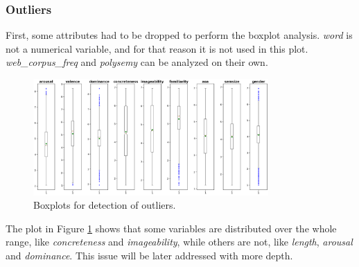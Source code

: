 \documentclass[a4paper,11pt,dvipsnames]{article}
\begin{document}

\subsubsection{Outliers}


First, some attributes had to be dropped to perform the boxplot analysis. \textit{word} is not a numerical variable, and for that reason it is not used in this plot. \textit{web\_corpus\_freq} and \textit{polysemy} can be analyzed on their own.

\begin{figure}[h]
    \centering
    \includegraphics[width=0.8\textwidth]{Graphs/outliers.png}
    \caption{Boxplots for detection of outliers.}
    \label{fig:outliers}
\end{figure}

The plot in Figure \ref{fig:outliers} shows that some variables are distributed over the whole range, like \textit{concreteness} and \textit{imageability}, while others are not, like \textit{length}, \textit{arousal} and \textit{dominance}. This issue will be later addressed with more depth.
\end{document}
